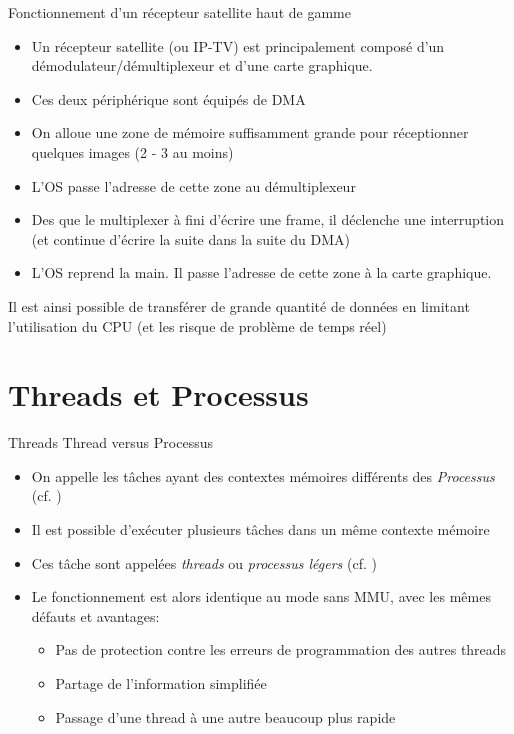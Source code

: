 \begin{frame}[fragile=singleslide]{Fonctionnement    d'un    récepteur
    satellite haut de gamme}
  \begin{itemize}
  \item Un  récepteur satellite  (ou IP-TV) est  principalement composé
    d'un démodulateur/démultiplexeur et d'une carte graphique.
  \item Ces deux périphérique sont équipés de DMA
  \item  On  alloue  une  zone  de  mémoire  suffisamment  grande  pour
    réceptionner quelques images (2 - 3 au moins)
  \item L'OS passe l'adresse de cette zone au démultiplexeur
  \item Des que le multiplexer à fini d'écrire une frame, il déclenche
    une interruption (et  continue d'écrire la suite dans  la suite du
    DMA)
  \item L'OS  reprend la main. Il  passe l'adresse de cette  zone à la
    carte graphique.
  \end{itemize}
  Il est ainsi possible de transférer de grande quantité de données en
  limitant l'utilisation  du CPU (et  les risque de problème  de temps
  réel)
\end{frame}

\section{Threads et Processus}

\begin{frame}{Threads}
  Thread versus Processus
  \begin{itemize}
  \item On appelle les  tâches ayant des contextes mémoires différents
    des \emph{Processus} (cf. )
  \item  Il est  possible  d'exécuter plusieurs  tâches  dans un  même
    contexte mémoire
  \item  Ces  tâche sont  appelées  \emph{threads} ou  \emph{processus
      légers} (cf. )
  \item Le fonctionnement  est alors identique au mode  sans MMU, avec
    les mêmes défauts et avantages:
    \begin{itemize}
    \item Pas  de protection contre  les erreurs de  programmation des
      autres threads
    \item Partage de l'information simplifiée
    \item Passage d'une thread à une autre beaucoup plus rapide
    \end{itemize}
  \end{itemize}
\end{frame}

